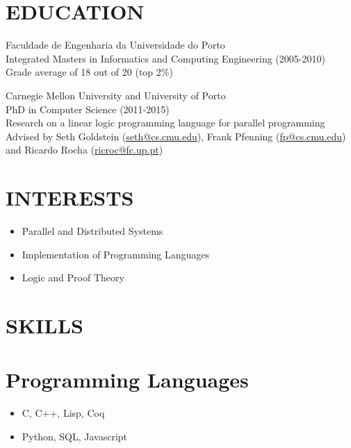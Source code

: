 \documentclass[margin]{res}
\begin{document}

\address{Rua 1º de Maio, nº 48 \\   3515-560 Bodiosa, Portugal \\   (+351) 936 229 412 \\ flaviocruz@gmail.com \\ \url{http://cs.cmu.edu/~fmfernan}}

\begin{resume}

\section{EDUCATION}       Faculdade de Engenharia da Universidade do Porto \\
                Integrated Masters in Informatics and Computing Engineering (2005-2010) \\
                Grade average of 18 out of 20 (top 2\%)
                
                Carnegie Mellon University and University of Porto \\
                PhD in Computer Science (2011-2015) \\
                Research on a linear logic programming language for parallel programming \\
                Advised by Seth Goldstein (\url{seth@cs.cmu.edu}), Frank Pfenning (\url{fp@cs.cmu.edu}) and Ricardo Rocha (\url{ricroc@fc.up.pt})\\

\section{INTERESTS}

                 \begin{itemize}
                    \item Parallel and Distributed Systems
                    \item Implementation of Programming Languages
                    \item Logic and Proof Theory
                 \end{itemize}
                  
\section{SKILLS} 
\normalsize{\section{Programming Languages}}
                 \begin{itemize}
                 \item C, C++, Lisp, Coq
                 \item Python, SQL, Javascript
                 \end{itemize}
                 

\end{resume}
\end{document}
